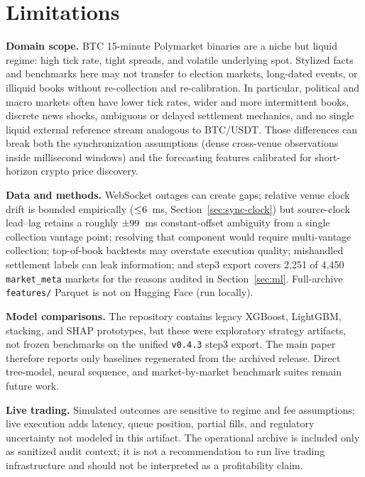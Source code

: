 \section{Limitations}
\label{sec:limitations}

\textbf{Domain scope.} BTC 15-minute Polymarket binaries are a niche but liquid
regime: high tick rate, tight spreads, and volatile underlying spot. Stylized
facts and benchmarks here may not transfer to election markets, long-dated
events, or illiquid books without re-collection and re-calibration. In
particular, political and macro markets often have lower tick rates, wider and
more intermittent books, discrete news shocks, ambiguous or delayed settlement
mechanics, and no single liquid external reference stream analogous to
BTC/USDT. Those differences can break both the synchronization assumptions
(dense cross-venue observations inside millisecond windows) and the forecasting
features calibrated for short-horizon crypto price discovery.

\textbf{Data and methods.} WebSocket outages can create gaps; relative venue
clock drift is bounded empirically
(${\leq}6{}$~ms, Section~\ref{sec:sync-clock}) but
source-clock lead--lag retains a roughly
$\pm99{}$~ms constant-offset ambiguity from a single
collection vantage point; resolving that component would require
multi-vantage collection; top-of-book backtests may overstate execution
quality; mishandled
settlement labels can leak information; and step3 export covers 2{,}251 of
4{,}450 \texttt{market\_meta} markets for the reasons audited in
Section~\ref{sec:ml}. Full-archive \texttt{features/} Parquet is not on
Hugging Face (run  locally).

\textbf{Model comparisons.} The repository contains legacy XGBoost, LightGBM,
stacking, and SHAP prototypes, but these were exploratory strategy artifacts,
not frozen benchmarks on the unified \texttt{v0.4.3} step3 export. The main
paper therefore reports only baselines regenerated from the archived release.
Direct tree-model, neural sequence, and market-by-market benchmark suites remain
future work.

\textbf{Live trading.} Simulated outcomes are sensitive to regime and fee
assumptions; live execution adds latency, queue position, partial fills, and
regulatory uncertainty not modeled in this artifact. The operational archive is
included only as sanitized audit context; it is not a recommendation to run live
trading infrastructure and should not be interpreted as a profitability claim.

